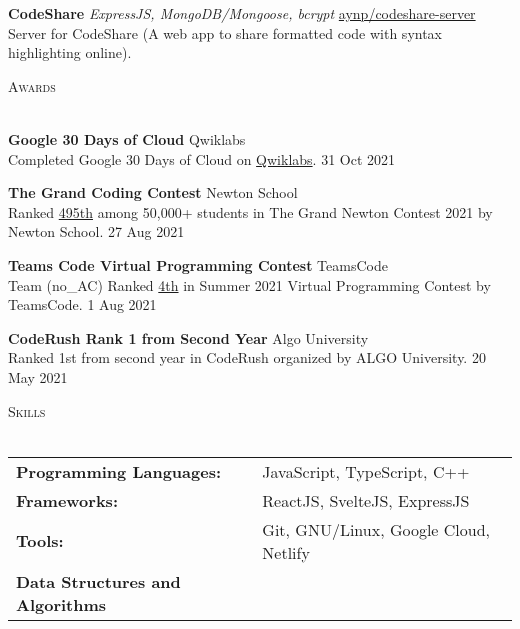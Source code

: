 \documentclass[a4paper]{article}
\newcommand{\lineunder} {
    \vspace*{-8pt} \\
    \hspace*{-18pt} \hrulefill \\
}
\newcommand{\header} [1] {
    {\hspace*{-18pt}\vspace*{6pt} \textsc{#1}}
    \vspace*{-6pt} \lineunder
}
\begin{document}
{\textbf{CodeShare}} {\sl ExpressJS, MongoDB/Mongoose, bcrypt} \hfill \href{https://github.com/aynp/codeshare-server}{aynp/codeshare-server}\\
Server for CodeShare (A web app to share formatted code with syntax highlighting online).\\
\vspace*{2mm}



\header{Awards}
\vspace{1mm}

\textbf{Google 30 Days of Cloud} \hfill Qwiklabs\\
Completed Google 30 Days of Cloud on \href{https://www.qwiklabs.com/public_profiles/4c78c6d8-ad43-4991-b8fe-03e559c1bac5}{Qwiklabs}. \hfill 31 Oct 2021\\
\vspace*{2mm}

\textbf{The Grand Coding Contest} \hfill Newton School\\
Ranked \href{https://www.linkedin.com/posts/aryanpathania03_aryan-has-secured-rank-495-in-newtons-grand-activity-6841777869484642304-YhKD}{495th} among 50,000+ students in The Grand Newton Contest 2021 by Newton School. \hfill 27 Aug 2021\\
\vspace*{2mm}

\textbf{Teams Code Virtual Programming Contest} \hfill TeamsCode\\
Team (no\_AC) Ranked \href{https://youtu.be/eCylTCHctY0?t=16137}{4th} in Summer 2021 Virtual Programming Contest by TeamsCode. \hfill 1 Aug 2021\\
\vspace*{2mm}

\textbf{CodeRush Rank 1 from Second Year} \hfill Algo University\\
Ranked 1st from second year in CodeRush organized by ALGO University. \hfill 20 May 2021\\
\vspace*{2mm}




\header{Skills}
\vspace{1mm}
\begin{tabular}{ l l }
	\textbf{Programming Languages:}          & JavaScript, TypeScript, C++               \\
	\textbf{Frameworks:}                     & ReactJS, SvelteJS, ExpressJS              \\
	\textbf{Tools:}                          & Git, GNU/Linux, Google Cloud, Netlify       \\
	\textbf{Data Structures and Algorithms} &                                            \\
\end{tabular}
\vspace{2mm}
\end{document}
